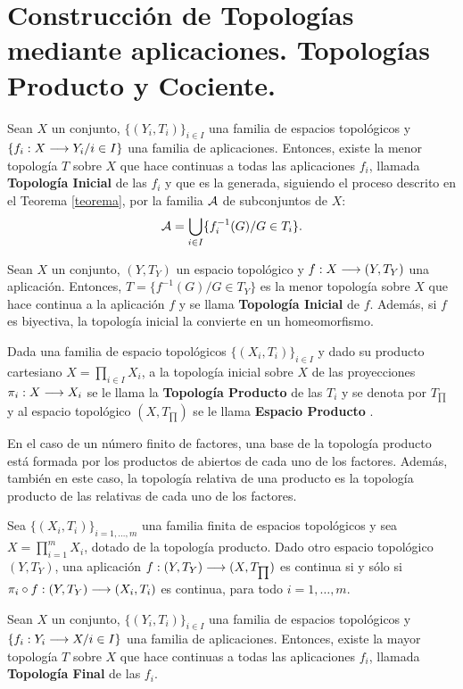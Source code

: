 \documentclass[cursovd_portada.tex]{subfiles}
\begin{document}
\section{Construcción de Topologías mediante aplicaciones. Topologías Producto y Cociente.}
\begin{prop}
Sean $X$ un conjunto, $\{(Y_i,T_i)\}_{i\in I}$ una familia de espacios topológicos y $\{f_i:X\longrightarrow Y_i/i\in I\}$ una
familia de aplicaciones. Entonces, existe la menor topología $T$ sobre $X$ que hace continuas a todas las
aplicaciones $f_i$, llamada {\bf Topología Inicial} de las $f_i$ y que es la generada, siguiendo el proceso
descrito en el Teorema \ref{teorema}, por la familia ${\cal A}$ de subconjuntos de $X$:
$${\cal A}=\bigcup_{i\in I}\{f_i^{-1}(G)/G\in T_i\}.$$
\end{prop}
\begin{coro}
Sean $X$ un conjunto, $(Y,T_Y)$ un espacio topológico y $f:X\longrightarrow (Y,T_Y)$ una aplicación. Entonces,
$T=\{f^{-1}(G)/G\in T_Y\}$ es la menor topología sobre $X$ que hace continua a la aplicación $f$ y se llama {\bf
Topología Inicial} de $f$. Además, si $f$ es biyectiva, la topología inicial la convierte en un homeomorfismo.
\end{coro}
\begin{defi}
Dada una familia de espacio topológicos $\{(X_i,T_i)\}_{i\in I}$ y dado su producto cartesiano $X=\prod_{i\in
I}X_i$, a la topología inicial sobre $X$ de las proyecciones $\pi_i:X\longrightarrow X_i$ se le llama la {\bf Topología
Producto} de las $T_i$ y se denota por $T_{\prod}$ y al espacio topológico $(X,T_{\prod})$ se le llama {\bf
Espacio Producto} .
\end{defi}
\begin{nota}
{\rm En el caso de un número finito de factores, una base de la topología producto está formada por los productos
de abiertos de cada uno de los factores. Además, también en este caso, la topología relativa de una producto es la
topología producto de las relativas de cada uno de los factores.}
\end{nota}
\begin{prop}
Sea $\{(X_i,T_i)\}_{i=1,\dots ,m}$ una familia finita de espacios to\-po\-ló\-gi\-cos y sea $X=\prod_{i=1}^mX_i$,
dotado de la topología producto. Dado otro espacio topológico $(Y,T_Y)$, una aplicación $f:(Y,T_Y)\longrightarrow
(X,T_{\prod})$ es continua si y sólo si $\pi_i\circ f:(Y,T_Y)\longrightarrow (X_i,T_i)$ es continua, para todo $i=1,\dots ,m$.
\end{prop}
\begin{prop}
Sean $X$ un conjunto, $\{(Y_i,T_i)\}_{i\in I}$ una familia de espacios topológicos y $\{f_i:Y_i\longrightarrow X/i\in I\}$ una
familia de aplicaciones. Entonces, existe la mayor topología $T$ sobre $X$ que hace continuas a todas las
aplicaciones $f_i$, llamada {\bf Topología Final} de las $f_i$.
\end{prop}
\end{document}
